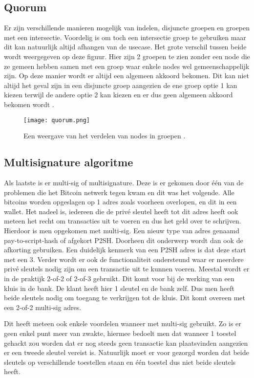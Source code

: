 \subsection{Quorum}
Er zijn verschillende manieren mogelijk van indelen, disjuncte groepen en groepen met een intersectie. Voordelig is om toch een intersectie groep te gebruiken maar dit kan natuurlijk altijd afhangen van de usecase. Het grote verschil tussen beide wordt weergegeven op deze figuur. Hier zijn  2 groepen te zien zonder een node die ze gemeen hebben samen met een groep waar enkele nodes wel gemeenschappelijk zijn. Op deze manier wordt er altijd een algemeen akkoord bekomen. Dit kan niet altijd het geval zijn in een disjuncte groep aangezien de ene groep optie 1 kan kiezen terwijl de andere optie 2 kan kiezen en er dus geen algemeen akkoord bekomen wordt \textcite{Stellar2015}.

\begin{figure}
	\texttt{[image: quorum.png]}
	\caption{Een weergave van het verdelen van nodes in groepen \textcite{Stellar2015}.}
	\label{fig:quorum}
\end{figure}

\subsection{Multisignature algoritme}
Als laatste is er multi-sig of multisignature. Deze is er gekomen door één van de problemen die het Bitcoin netwerk tegen kwam en dit was het volgende. Alle bitcoins worden opgeslagen op 1 adres zoals voorheen overlopen, en dit in een wallet. Het nadeel is, iedereen die de privé sleutel heeft tot dit adres heeft ook meteen het recht om transacties uit te voeren en dus het geld over te schrijven. Hierdoor is men opgekomen met multi-sig. Een nieuw type van adres genaamd pay-to-script-hash of afgekort P2SH. Doorheen dit onderwerp wordt dan ook de afkorting gebruiken. Een duidelijk kenmerk van een P2SH adres is dat deze start met een 3. Verder wordt er ook de functionaliteit ondersteund waar er meerdere privé sleutels nodig zijn om een transactie uit te kunnen voeren. Meestal wordt er in de praktijk 2-of-2 of 2-of-3 gebruikt. Dit komt voor bij de werking van een kluis in de bank. De klant heeft hier 1 sleutel en de bank zelf. Dus men heeft beide sleutels nodig om toegang te verkrijgen tot de kluis. Dit komt overeen met een 2-of-2 multi-sig adres. 

Dit heeft meteen ook enkele voordelen wanneer met multi-sig gebruikt. Zo is er geen enkel punt meer van zwakte, hiermee bedoelt men dat wanneer 1 toestel gehackt zou worden dat er nog steeds geen transactie kan plaatsvinden aangezien er een tweede sleutel vereist is. Natuurlijk moet er voor gezorgd worden dat beide sleutels op verschillende toestellen staan en één toestel dus niet beide sleutels heeft. 


